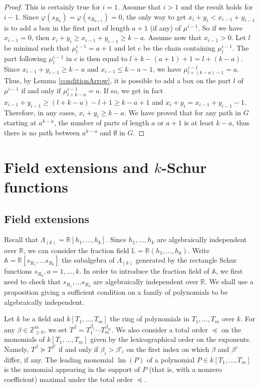 \documentclass[ALCO,ThmDefs,Unicode,epreuves]{cedram}
\DeclareMathOperator{\lm}{lm}
\begin{document}
\begin{proof}
\noindent This is certainly true for $i=1$. Assume that $i>1$ and the result
holds for $i-1$. Since $\varphi(s_{R_{a}})=\varphi(s_{R_{a+1}})=0$, the only
way to get $x_{i}+y_{i}<x_{i-1}+y_{i-1}$ is to add a box in the first part of
length $a+1$ (if any) of $\mu^{i-1}$. So if we have $x_{i-1}=0$, then
$x_{i}+y_{i}\geq x_{i-1}+y_{i-1}\geq k-a$. Assume now that $x_{i-1}>0$. Let
$l$ be minimal such that $\mu_{l}^{i-1}=a+1$ and let $c$ be the chain
containing $\mu_{l}^{i-1}$. The part following $\mu_{l}^{i-1}$ in $c$ is then
equal to $l+k-(a+1)+1=l+(k-a)$. Since $x_{i-1}+y_{i-1}\geq k-a$ and
$x_{i-1}\leq k-a-1$, we have $\mu_{l+(k-a)-1}^{i-1}=a$. Thus, by Lemma
\ref{conditionArrow}, it is possible to add a box on the part $l$ of
$\mu^{i-1}$ if and only if $\mu_{l+k-a}^{i-1}=a.$ If so, we get in fact
$x_{i-1}+y_{i-1}\geq(l+k-a)-l+1\geq k-a+1$ and $x_{i}+y_{i}=x_{i-1}+y_{i-1}%
-1$. Therefore, in any cases, $x_{i}+y_{i}\geq k-a$. We have proved that for
any path in $G$ starting at $a^{k-a}$, the number of parts of length $a$ or
$a+1$ is at least $k-a$, thus there is no path between $a^{k-a}$ and
$\emptyset$ in $G$.
\end{proof}

\section{Field extensions and \texorpdfstring{$k$}{k}-Schur functions}\label{section4}

\label{Secion_Field}

\subsection{Field extensions}

Recall that $\Lambda_{(k)}\mathbb{=R}[h_{1},\ldots,h_{k}]$. Since
$h_{1},\ldots,h_{k}$ are algebraically independent over $\mathbb{R}$, we can
consider the fraction field $\mathbb{L}=\mathbb{R}(h_{1},\ldots,h_{k}%
)$. Write $\mathbb{A}=\mathbb{R}[s_{R_{1}},\ldots s_{R_{k}}]$ the subalgebra
of $\Lambda_{(k)}$ generated by the rectangle Schur functions $s_{R_{a}%
},a=1,\ldots,k$. In order to introduce the fraction field of $\mathbb{A}$, we
first need to check that $s_{R_{1}},\ldots s_{R_{k}}$ are algebraically
independent over $\mathbb{R}$. We shall use a proposition giving a sufficient
condition on a family of polynomials to be algebraically independent.

Let $k$ be a field and $k[T_{1},\ldots,T_{m}]$ the ring of polynomials in
$T_{1},\ldots,T_{m}$ over $k$. For any $\beta\in\mathbb{Z}_{\geq0}^{m}$, we
set $T^{\beta}=T_{1}^{\beta_{1}}\cdots T_{m}^{\beta_{m}}$. We also consider a total order $\preceq$ on the monomials of $k[T_{1},\ldots,T_{m}]$ given by the lexicographical order on the exponents. Namely, $T^{\beta}\succeq T^{\beta'}$ if and only if $\beta_{i}> \beta'_{i}$ on the first index on which $\beta$ and $\beta'$ differ, if any. The
leading monomial $\lm (P)$ of a polynomial $P\in k[T_{1},\ldots,T_{m}]$
is the monomial appearing in the support of $P$ (that is, with a nonzero
coefficient) maximal under the total order $\preceq$.
\end{document}
